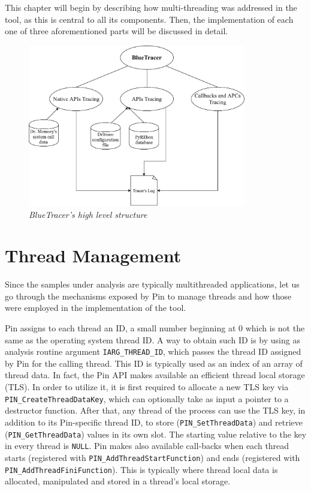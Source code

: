 This chapter will begin by describing how multi-threading was addressed in the tool, as this is central to all its components. Then, the implementation of each one of three aforementioned parts will be discussed in detail. 

\begin{figure}[h]
\centering
\includegraphics[width=0.85\textwidth]{Figures/BlueTracer.pdf}
\caption{\textit{BlueTracer's high level structure}}
\end{figure}

\section{Thread Management}

Since the samples under analysis are typically multithreaded applications, let us go through the mechanisms exposed by Pin to manage threads and how those were employed in the implementation of the tool.

Pin assigns to each thread an ID, a small number beginning at 0
which is not the same as the operating system thread ID. A way to obtain such ID is by using as analysis routine argument \texttt{IARG\_THREAD\_ID}, which passes the thread ID assigned by Pin for the calling thread. This ID is typically used as an index of an array of thread data.
In fact, the Pin API makes available an efficient thread local storage (TLS). In order to utilize it, it is first required to allocate a new TLS key via \texttt{PIN\_CreateThreadDataKey}, which can optionally take as input a pointer to a destructor function. After that, any thread of the process can use the TLS key, in addition to its Pin-specific thread ID, to store (\texttt{PIN\_SetThreadData}) and retrieve (\texttt{PIN\_GetThreadData}) values in its own slot. The starting value relative to the key in every thread is \texttt{NULL}.
Pin makes also available call-backs when each thread starts (registered with \texttt{PIN\_AddThreadStartFunction}) and ends (registered with \texttt{PIN\_AddThreadFiniFunction}). This is typically where thread local data is allocated, manipulated and stored in a thread's local storage\cite{Pin}.

